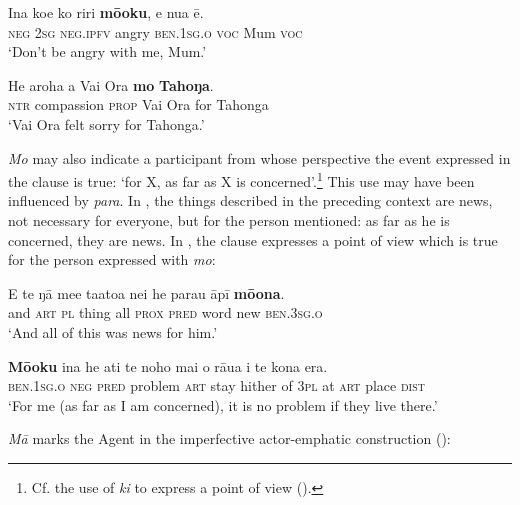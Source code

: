 \ea\label{ex:4.286}
\gll {\ꞌ}Ina koe ko riri \textbf{mō{\ꞌ}oku}, e nua ē. \\
\textsc{neg} \textsc{2sg} \textsc{neg.ipfv} angry \textsc{ben.1sg.o} \textsc{voc} Mum \textsc{voc} \\

\glt 
‘Don’t be angry with me, Mum.’ \textstyleExampleref{[R229.497]} 
\z

\ea\label{ex:4.287}
\gll He {\ꞌ}aroha a Vai Ora \textbf{mo} \textbf{Tahoŋa}. \\
\textsc{ntr} compassion \textsc{prop} Vai Ora for Tahonga \\

\glt
‘Vai Ora felt sorry for Tahonga.’ \textstyleExampleref{[R301.249]} 
\z

\textit{Mo} may also indicate a participant from whose perspective the event expressed in the clause is true: ‘for X, as far as X is concerned’.\footnote{\label{fn:236}Cf. the use of \textit{ki} to express a point of view ().} This use may have been influenced by  \textit{para}. In , the things described in the preceding context are news, not necessary for everyone, but for the person mentioned: as far as he is concerned, they are news. In , the clause expresses a point of view which is true for the person expressed with \textit{mo}:

\ea\label{ex:4.288}
\gll {\ꞌ}E te ŋā me{\ꞌ}e ta{\ꞌ}ato{\ꞌ}a nei he parau {\ꞌ}āpī \textbf{mō{\ꞌ}ona}.\\
and \textsc{art} \textsc{pl} thing all \textsc{prox} \textsc{pred} word new \textsc{ben.3sg.o}\\

\glt 
‘And all of this was news for him.’ \textstyleExampleref{[R363.055]} 
\z

\ea\label{ex:4.289}
\gll \textbf{Mō{\ꞌ}oku} {\ꞌ}ina he {\ꞌ}ati te noho mai o rāua {\ꞌ}i te kona era.\\
\textsc{ben.1sg.o} \textsc{neg} \textsc{pred} problem \textsc{art} stay hither of \textsc{3pl} at \textsc{art} place \textsc{dist}\\

\glt
‘For me (as far as I am concerned), it is no problem if they live there.’ \textstyleExampleref{[R647.163]} 
\z

\textit{Mā} marks the Agent in the imperfective actor-emphatic construction ():

